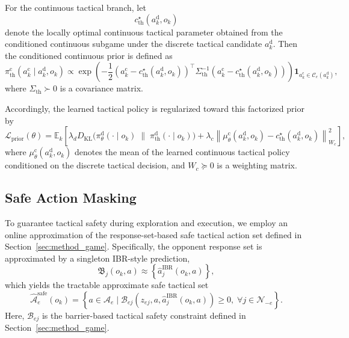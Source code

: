 \documentclass[final ,3p, times]{elsarticle}
\begin{document}
For the continuous tactical branch, let
\begin{equation}
c_{\mathrm{th}}^{\star}(a_k^{\mathrm{d}},o_k)
\label{eq:continuous_theory_target}
\end{equation}
denote the locally optimal continuous tactical parameter obtained from the conditioned continuous subgame under the discrete tactical candidate $a_k^{\mathrm{d}}$. Then the conditioned continuous prior is defined as
\begin{equation}
\pi_{\mathrm{th}}^{\mathrm{c}}(a_k^{\mathrm{c}}\mid a_k^{\mathrm{d}},o_k)
\propto
\exp\!\left(
-\frac{1}{2}
\left(a_k^{\mathrm{c}}-c_{\mathrm{th}}^{\star}(a_k^{\mathrm{d}},o_k)\right)^\top
\Sigma_{\mathrm{th}}^{-1}
\left(a_k^{\mathrm{c}}-c_{\mathrm{th}}^{\star}(a_k^{\mathrm{d}},o_k)\right)
\right)
\mathbf{1}_{a_k^{\mathrm{c}}\in\mathcal{C}_e(a_k^{\mathrm{d}})},
\label{eq:continuous_theory_prior}
\end{equation}
where $\Sigma_{\mathrm{th}} \succ 0$ is a covariance matrix.

Accordingly, the learned tactical policy is regularized toward this factorized prior by
\begin{equation}
\mathcal{L}_{\mathrm{prior}}(\theta)
=
\mathbb{E}_k
\left[
\lambda_d
D_{\mathrm{KL}}
\big(
\pi_\theta^{\mathrm{d}}(\cdot\mid o_k)
\;\|\;
\pi_{\mathrm{th}}^{\mathrm{d}}(\cdot\mid o_k)
\big)
+
\lambda_c
\left\|
\mu_\theta^{\mathrm{c}}(a_k^{\mathrm{d}},o_k)-c_{\mathrm{th}}^{\star}(a_k^{\mathrm{d}},o_k)
\right\|_{W_c}^{2}
\right],
\label{eq:prior_regularization}
\end{equation}
where $\mu_\theta^{\mathrm{c}}(a_k^{\mathrm{d}},o_k)$ denotes the mean of the learned continuous tactical policy conditioned on the discrete tactical decision, and $W_c \succeq 0$ is a weighting matrix.



\subsection{Safe Action Masking}
\label{subsec:safe_action_masking}

To guarantee tactical safety during exploration and execution, we employ an online approximation of the response-set-based safe tactical action set defined in Section~\ref{sec:method_game}. Specifically, the opponent response set is approximated by a singleton IBR-style prediction,
\begin{equation}
\mathfrak{B}_j(o_k,a)
\approx
\left\{
\hat a_j^{\mathrm{IBR}}(o_k,a)
\right\},
\label{eq:singleton_safe_response}
\end{equation}
which yields the tractable approximate safe tactical set
\begin{equation}
\widehat{\mathcal{A}}_e^{\mathrm{safe}}(o_k)
=
\left\{
a \in \mathcal{A}_e
\mid
\mathcal{B}_{ej}\!\left(z_{ej},a,\hat a_j^{\mathrm{IBR}}(o_k,a)\right)\ge 0,\;
\forall j\in\mathcal{N}_{-e}
\right\}.
\label{eq:safe_action_mask}
\end{equation}
Here, $\mathcal{B}_{ej}$ is the barrier-based tactical safety constraint defined in Section~\ref{sec:method_game}.
\end{document}

